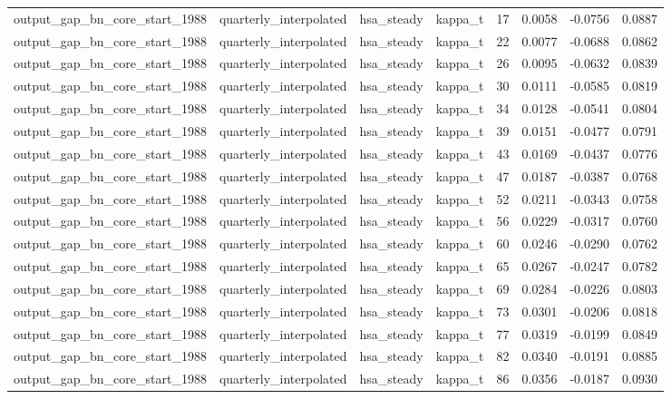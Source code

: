 \begin{tabular}{llllrrrr}
output\_gap\_bn\_core\_start\_1988 & quarterly\_interpolated & hsa\_steady & kappa\_t & 17 & 0.0058 & -0.0756 & 0.0887 \\
output\_gap\_bn\_core\_start\_1988 & quarterly\_interpolated & hsa\_steady & kappa\_t & 22 & 0.0077 & -0.0688 & 0.0862 \\
output\_gap\_bn\_core\_start\_1988 & quarterly\_interpolated & hsa\_steady & kappa\_t & 26 & 0.0095 & -0.0632 & 0.0839 \\
output\_gap\_bn\_core\_start\_1988 & quarterly\_interpolated & hsa\_steady & kappa\_t & 30 & 0.0111 & -0.0585 & 0.0819 \\
output\_gap\_bn\_core\_start\_1988 & quarterly\_interpolated & hsa\_steady & kappa\_t & 34 & 0.0128 & -0.0541 & 0.0804 \\
output\_gap\_bn\_core\_start\_1988 & quarterly\_interpolated & hsa\_steady & kappa\_t & 39 & 0.0151 & -0.0477 & 0.0791 \\
output\_gap\_bn\_core\_start\_1988 & quarterly\_interpolated & hsa\_steady & kappa\_t & 43 & 0.0169 & -0.0437 & 0.0776 \\
output\_gap\_bn\_core\_start\_1988 & quarterly\_interpolated & hsa\_steady & kappa\_t & 47 & 0.0187 & -0.0387 & 0.0768 \\
output\_gap\_bn\_core\_start\_1988 & quarterly\_interpolated & hsa\_steady & kappa\_t & 52 & 0.0211 & -0.0343 & 0.0758 \\
output\_gap\_bn\_core\_start\_1988 & quarterly\_interpolated & hsa\_steady & kappa\_t & 56 & 0.0229 & -0.0317 & 0.0760 \\
output\_gap\_bn\_core\_start\_1988 & quarterly\_interpolated & hsa\_steady & kappa\_t & 60 & 0.0246 & -0.0290 & 0.0762 \\
output\_gap\_bn\_core\_start\_1988 & quarterly\_interpolated & hsa\_steady & kappa\_t & 65 & 0.0267 & -0.0247 & 0.0782 \\
output\_gap\_bn\_core\_start\_1988 & quarterly\_interpolated & hsa\_steady & kappa\_t & 69 & 0.0284 & -0.0226 & 0.0803 \\
output\_gap\_bn\_core\_start\_1988 & quarterly\_interpolated & hsa\_steady & kappa\_t & 73 & 0.0301 & -0.0206 & 0.0818 \\
output\_gap\_bn\_core\_start\_1988 & quarterly\_interpolated & hsa\_steady & kappa\_t & 77 & 0.0319 & -0.0199 & 0.0849 \\
output\_gap\_bn\_core\_start\_1988 & quarterly\_interpolated & hsa\_steady & kappa\_t & 82 & 0.0340 & -0.0191 & 0.0885 \\
output\_gap\_bn\_core\_start\_1988 & quarterly\_interpolated & hsa\_steady & kappa\_t & 86 & 0.0356 & -0.0187 & 0.0930 \\

\end{tabular}
